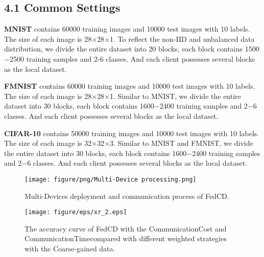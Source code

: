 \documentclass[twoside,twocolumn]{article}
\begin{document}
\begin{spacing}{1.0}
\subsection{4.1 Common Settings}
	\textbf{MNIST} contains 60000 training images and 10000 test images with 10 labels. The size of each image is 28$\times $28$\times $1. To reflect the non-IID and unbalanced data distribution, we divide the entire dataset into 20 blocks, each block contains 1500$-$2500 training samples and 2-6 classes. And each client possesses several blocks as the local dataset. 

	\textbf{FMNIST} contains 60000 training images and 10000 test images with 10 labels. The size of each image is 28$\times $28$\times $1. Similar to MNIST, we divide the entire dataset into 30 blocks, each block contains 1600$-$2400 training samples and 2$-$6 classes. And each client possesses several blocks as the local dataset. 
	
	\textbf{CIFAR-10} contains 50000 training images and 10000 test images with 10 labels. The size of each image is 32$\times $32$\times $3. Similar to MNIST and FMNIST, we divide the entire dataset into 30 blocks, each block contains 1600$-$2400 training samples and 2$-$6 classes. And each client possesses several blocks as the local dataset. 

\begin{figure}
\centerline{\texttt{[image: figure/png/Multi-Device processing.png]}}
\caption{Multi-Devices deployment and communication process of FedCD.} \label{fig3}
\end{figure}

\begin{figure*}
\centerline{\texttt{[image: figure/eps/xr\_2.eps]}}
\caption{The accuracy curve of FedCD with the CommunicationCost and CommunicationTimecompared with different weighted strategies with the Coarse-gained data.} \label{fig4}
\end{figure*}
%


\end{spacing}
\end{document}
